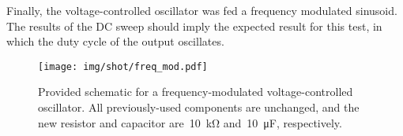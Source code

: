 Finally, the voltage-controlled oscillator was fed a frequency modulated
sinusoid.  The results of the DC sweep should imply the expected result for
this test, in which the duty cycle of the output oscillates.
%
\begin{figure}[H]
	\centering
	\texttt{[image: img/shot/freq\_mod.pdf]}
	\parbox{.6\textwidth}{
	\caption{Provided schematic for a frequency-modulated voltage-controlled
	oscillator.  All previously-used components are unchanged, and the new
	resistor and capacitor are~\SI{10}{\kilo\ohm} and~\SI{10}{\micro\farad},
	respectively.}
	\label{fig:freq_mod}}
\end{figure}
